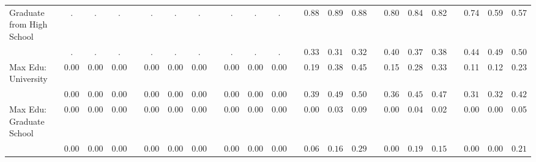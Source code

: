 \begin{center}
{\begin{longtable}{L{12em} c c c p{1.2em} c c c p{1.2em} c c c p{1.2em} c c c p{1.2em} c c c p{1.2em} c c c}
Graduate from High School & . &         . &         . & &         . &         . &         . & &         . &         . &         . & &      0.88 &      0.89 &      0.88 & &      0.80 &      0.84 &      0.82 & &      0.74 &      0.59 &      0.57 \\*
& $\mathit{        .}$ & $\mathit{        .}$ & $\mathit{        .}$ & & $\mathit{        .}$ & $\mathit{        .}$ & $\mathit{        .}$ & & $\mathit{        .}$ & $\mathit{        .}$ & $\mathit{        .}$ & & $\mathit{     0.33}$ & $\mathit{     0.31}$ & $\mathit{     0.32}$ & & $\mathit{     0.40}$ & $\mathit{     0.37}$ & $\mathit{     0.38}$ & & $\mathit{     0.44}$ & $\mathit{     0.49}$ & $\mathit{     0.50}$ \\[.7em]
Max Edu: University & 0.00 &      0.00 &      0.00 & &      0.00 &      0.00 &      0.00 & &      0.00 &      0.00 &      0.00 & &      0.19 &      0.38 &      0.45 & &      0.15 &      0.28 &      0.33 & &      0.11 &      0.12 &      0.23 \\*
& $\mathit{     0.00}$ & $\mathit{     0.00}$ & $\mathit{     0.00}$ & & $\mathit{     0.00}$ & $\mathit{     0.00}$ & $\mathit{     0.00}$ & & $\mathit{     0.00}$ & $\mathit{     0.00}$ & $\mathit{     0.00}$ & & $\mathit{     0.39}$ & $\mathit{     0.49}$ & $\mathit{     0.50}$ & & $\mathit{     0.36}$ & $\mathit{     0.45}$ & $\mathit{     0.47}$ & & $\mathit{     0.31}$ & $\mathit{     0.32}$ & $\mathit{     0.42}$ \\[.7em]
Max Edu: Graduate School & 0.00 &      0.00 &      0.00 & &      0.00 &      0.00 &      0.00 & &      0.00 &      0.00 &      0.00 & &      0.00 &      0.03 &      0.09 & &      0.00 &      0.04 &      0.02 & &      0.00 &      0.00 &      0.05 \\*
& $\mathit{     0.00}$ & $\mathit{     0.00}$ & $\mathit{     0.00}$ & & $\mathit{     0.00}$ & $\mathit{     0.00}$ & $\mathit{     0.00}$ & & $\mathit{     0.00}$ & $\mathit{     0.00}$ & $\mathit{     0.00}$ & & $\mathit{     0.06}$ & $\mathit{     0.16}$ & $\mathit{     0.29}$ & & $\mathit{     0.00}$ & $\mathit{     0.19}$ & $\mathit{     0.15}$ & & $\mathit{     0.00}$ & $\mathit{     0.00}$ & $\mathit{     0.21}$ \\[.7em]
\hline
\end{longtable}
}
\end{center}
